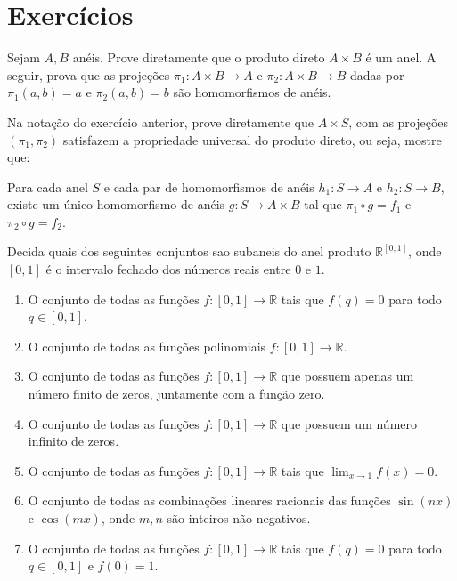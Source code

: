 \section{Exercícios}

\begin{exer}\label{exer:prod_anel}
    Sejam $A, B$ anéis.
    Prove diretamente que o produto direto $A\times B$ é um anel.
    A seguir, prova que as projeções $\pi_1:A\times B\rightarrow A$ e $\pi_2:A\times B\rightarrow B$ dadas por $\pi_1(a, b)=a$ e $\pi_2(a, b)=b$ são homomorfismos de anéis.
\end{exer}

\begin{exer}
    Na notação do exercício anterior, prove diretamente que $A\times S$, com as projeções $(\pi_1, \pi_2)$ satisfazem a propriedade universal do produto direto, ou seja, mostre que:

    Para cada anel $S$ e cada par de homomorfismos de anéis $h_1:S\rightarrow A$ e $h_2:S\rightarrow B$, existe um único homomorfismo de anéis $g:S\rightarrow A\times B$ tal que $\pi_1\circ g=f_1$ e $\pi_2\circ g=f_2$.
\end{exer}
\begin{exer}
Decida quais dos seguintes conjuntos sao subaneis do anel produto $\mathbb R^{[0, 1]}$, onde $[0, 1]$ é o intervalo fechado dos números reais entre $0$ e $1$.
\begin{enumerate}[label=\alph*)]
    \item O conjunto de todas as funções $f:[0, 1]\rightarrow \mathbb R$ tais que $f(q)=0$ para todo $q\in [0, 1]$.
    \item O conjunto de todas as funções polinomiais $f:[0, 1]\rightarrow \mathbb R$.
    \item O conjunto de todas as funções $f:[0, 1]\rightarrow \mathbb R$ que possuem apenas um número finito de zeros, juntamente com a função zero.
    \item O conjunto de todas as funções $f:[0, 1]\rightarrow \mathbb R$ que possuem um número infinito de zeros.
    \item O conjunto de todas as funções $f:[0, 1]\rightarrow \mathbb R$ tais que $\lim_{x\rightarrow 1}f(x)=0$.
    \item O conjunto de todas as combinações lineares racionais das funções $\sin(nx)$ e $\cos(mx)$, onde $m,n$ são inteiros não negativos.
    \item O conjunto de todas as funções $f:[0, 1]\rightarrow \mathbb R$ tais que $f(q)=0$ para todo $q\in [0, 1]$ e $f(0)=1$.
\end{enumerate}
\end{exer}